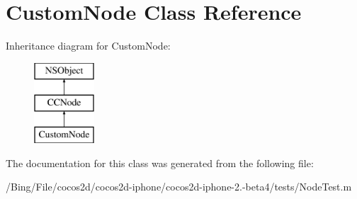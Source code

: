 \hypertarget{interface_custom_node}{\section{Custom\-Node Class Reference}
\label{interface_custom_node}
}
Inheritance diagram for Custom\-Node\-:\begin{figure}[H]
\begin{center}
\leavevmode
\includegraphics[height=3.000000cm]{interface_custom_node}
\end{center}
\end{figure}


The documentation for this class was generated from the following file\-:\begin{DoxyCompactItemize}
\item 
/\-Bing/\-File/cocos2d/cocos2d-\/iphone/cocos2d-\/iphone-\/2.-\/beta4/tests/Node\-Test.\-m\end{DoxyCompactItemize}
